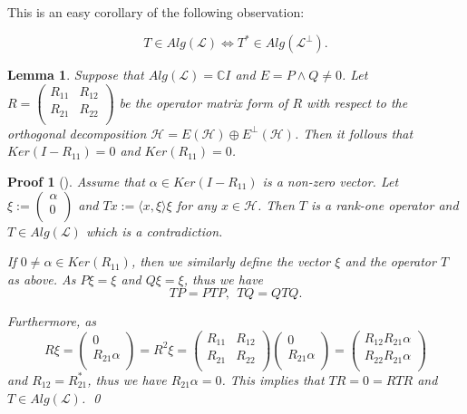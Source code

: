 \documentclass{jaums}
\theoremstyle{thmit} %
\newtheorem{lemma}[theorem]{Lemma}
\theoremstyle{thmrm} %
\newtheorem*{oldproof}{Proof}
\renewenvironment{proof}[1][{}]{\begin{oldproof}[#1]}{\qed\end{oldproof}}
\begin{document}
This is an easy corollary of the following observation:

$$T\in Alg(\mathcal{L}) \Leftrightarrow  T^{*}\in Alg(\mathcal{L}^{\perp}).$$


 \begin{lemma} Suppose that $Alg(\mathcal{L})=\mathbb{C}I$ and $E=P\wedge
Q\neq0$. Let $R=\left(
      \begin{array}{cc}
        R_{11} & R_{12} \\
        R_{21} & R_{22} \\
      \end{array}
    \right)$ be the operator matrix form of $R$
with respect to the orthogonal decomposition $\mathcal{H}=E(\mathcal{H})\oplus
E^{\perp}(\mathcal{H})$.
Then it follows that $Ker(I-R_{11})=0$ and $Ker(R_{11})=0$.
\end{lemma}

\begin{proof} Assume that $\alpha\in Ker(I-R_{11})$ is a non-zero vector. Let
$\xi:=\left(
      \begin{array}{c}
        \alpha \\
        0 \\
      \end{array}
    \right)$ and $Tx:=\langle x,\xi\rangle\xi$ for any $x\in\mathcal{H}$. Then
$T$ is a rank-one operator and
     $T\in Alg(\mathcal{L})$ which is a contradiction.

    If $0\neq\alpha\in Ker(R_{11})$, then we similarly define the vector $\xi$
and the operator $T$
    as above. As $P\xi=\xi$ and $Q\xi=\xi$, thus we have
$$TP=PTP, \    \ TQ=QTQ.$$

Furthermore, as $$R\xi=\left(
      \begin{array}{c}
        0 \\
        R_{21}\alpha \\
      \end{array}
    \right)=R^{2}\xi=\left(
      \begin{array}{cc}
        R_{11} & R_{12} \\
        R_{21} & R_{22} \\
      \end{array}
    \right)\left(
      \begin{array}{c}
        0 \\
        R_{21}\alpha \\
      \end{array}
    \right)=\left(
      \begin{array}{c}
        R_{12}R_{21}\alpha \\
        R_{22}R_{21}\alpha \\
      \end{array}
    \right)$$ and $R_{12} = R_{21}^{*}$, thus we have $R_{21}\alpha=0$.
This implies that $TR=0=RTR$ and $T\in Alg(\mathcal{L})$.
\end{proof}\\
\end{document}
